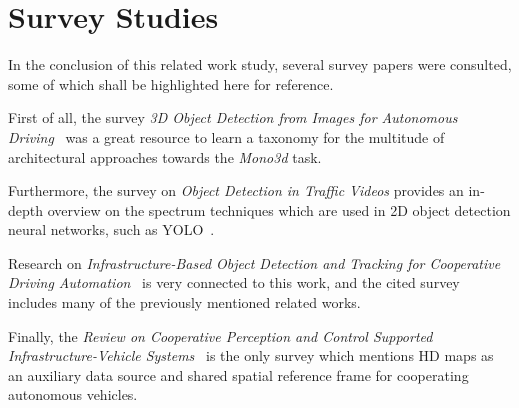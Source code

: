 \section{Survey Studies}
\label{sec:related-surveys}

In the conclusion of this related work study, several survey papers were consulted, some of which shall be highlighted here for reference.

First of all, the survey \textit{3D Object Detection from Images for Autonomous Driving}~\cite{survey2022} was a great resource to learn a taxonomy for the multitude of architectural approaches towards the \textit{Mono3d} task.

Furthermore, the survey on \textit{Object Detection in Traffic Videos} provides an in-depth overview on the spectrum techniques which are used in 2D object detection neural networks, such as YOLO~\cite{wang2022yolov7}.

Research on \textit{Infrastructure-Based Object Detection and Tracking for Cooperative Driving Automation}~\cite{bai2022infrastructure} is very connected to this work, and the cited survey includes many of the previously mentioned related works.

Finally, the \textit{Review on Cooperative Perception and Control Supported Infrastructure-Vehicle Systems}~\cite{yu2022review} is the only survey which mentions HD maps as an auxiliary data source and shared spatial reference frame for cooperating autonomous vehicles.
